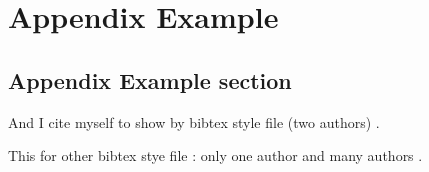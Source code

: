 \chapter{Appendix Example}
\label{chap:appendix1}

\section{Appendix Example section}

And I cite myself to show by bibtex style file (two authors) \cite{Commowick_MICCAI_2007}.

This for other bibtex stye file : only one author \cite{Oakes_RStat_1999} and many authors \cite{Guimond_CVIU_2000}.